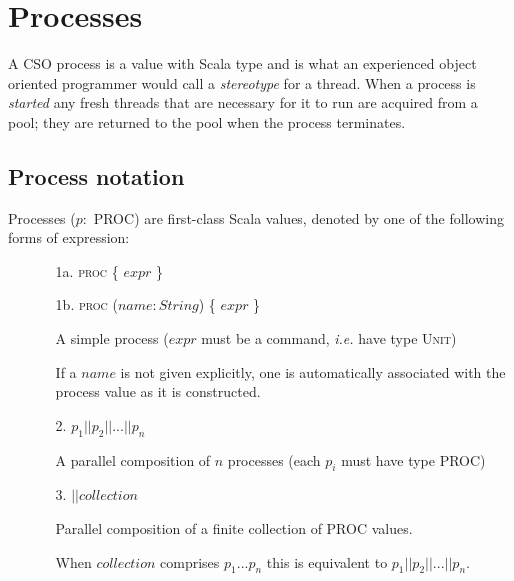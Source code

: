 \documentclass[12pt]{IOS-Book-Article-CPA-2017}
\begin{document}
\section{Processes}
A CSO process is a value with Scala type  and is
what an experienced object oriented programmer would call a
\textit{stereotype} for a thread. When a process is \textit{started}
any fresh threads that are necessary for it to run are acquired
from a pool; they are returned to the pool when the process
terminates.

\subsection{Process notation}
\label{Process Notation}
Processes ($p:$ \textsc{PROC}) are first-class Scala values, denoted by
one of the following forms of expression:
\begin{itemize}\item[]
\begin{itemize}

\item[1a.]  \textsc{proc} \{ \(expr\) \}                   
\item[1b.]  \textsc{proc} (\(name: String\)) \{ \(expr\) \}
  
  A simple process (\(expr\) must be a command, \textit{i.e.} have type \textsc{Unit})
  
  If a $name$ is not given explicitly, one is automatically associated with the process value
  as it is constructed.

   
\item[2.]  \(p_1 \mathrel{||} p_2 \mathrel{||} ... \mathrel{||} p_n\)  
  
  \quad A parallel composition of $n$ processes (each \(p_i\) must have type \textsc{PROC})

\item[3.] \(\mathrel{||} collection\)        
  
  \quad Parallel composition of a finite collection of \textsc{PROC} values.
  
  \quad When $collection$ comprises \(p_1 ... p_n\) this is equivalent to  
  \(p_1 \mathrel{||} p_2 \mathrel{||} ... \mathrel{||} p_n\).
\end{itemize}
\end{itemize}
\end{document}

